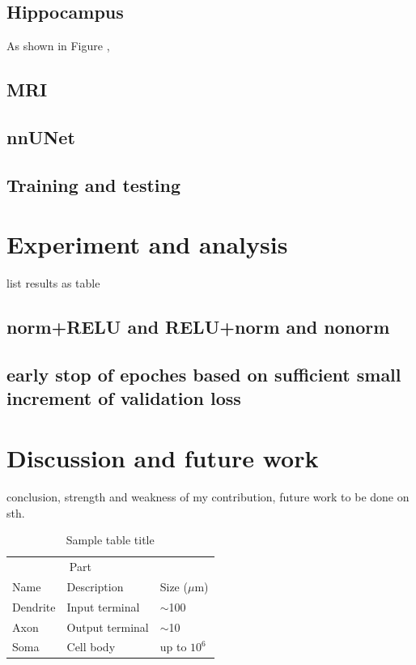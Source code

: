 \documentclass{article}
\begin{document}
\subsection{Hippocampus}

As shown in Figure ,





\subsection{MRI}



\subsection{nnUNet}


\subsection{Training and testing}



\section{Experiment and analysis}

list results as table

\subsection{norm+RELU and RELU+norm and nonorm}



\subsection{early stop of epoches based on sufficient small increment of validation loss}



\section{Discussion and future work}


conclusion, strength and weakness of my contribution, future work to be done on sth.






\begin{table}
  \caption{Sample table title}
  \label{sample-table}
  \centering
  \begin{tabular}{lll}
    \toprule
    \multicolumn{2}{c}{Part}                   \\
    \cmidrule(r){1-2}
    Name     & Description     & Size ($\mu$m) \\
    \midrule
    Dendrite & Input terminal  & $\sim$100     \\
    Axon     & Output terminal & $\sim$10      \\
    Soma     & Cell body       & up to $10^6$  \\
    \bottomrule
  \end{tabular}
\end{table}
\end{document}
